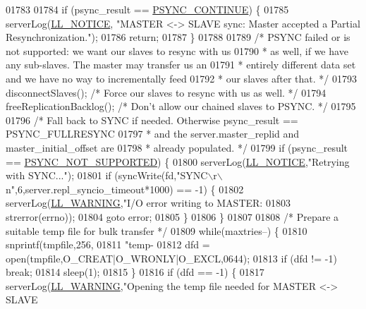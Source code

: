 \begin{DoxyCode}
{{{{{{{{{{{{{{{{{{{{{{{{{{{{{{{{{{{{{{{{{{{{{{{{{{{{{{{{{{{{{{{{{01783 
01784     \textcolor{keywordflow}{if} (psync\_result == \hyperlink{replication_8c_a96f39718bf5cfd2859bdaea530f509b9}{PSYNC\_CONTINUE}) \{
01785         serverLog(\hyperlink{server_8h_a8c54c191e436c7dd3012167212692401}{LL\_NOTICE}, \textcolor{stringliteral}{"MASTER <-> SLAVE sync: Master accepted a Partial
       Resynchronization."});
01786         \textcolor{keywordflow}{return};
01787     \}
01788 
01789     \textcolor{comment}{/* PSYNC failed or is not supported: we want our slaves to resync with us}
01790 \textcolor{comment}{     * as well, if we have any sub-slaves. The master may transfer us an}
01791 \textcolor{comment}{     * entirely different data set and we have no way to incrementally feed}
01792 \textcolor{comment}{     * our slaves after that. */}
01793     disconnectSlaves(); \textcolor{comment}{/* Force our slaves to resync with us as well. */}
01794     freeReplicationBacklog(); \textcolor{comment}{/* Don't allow our chained slaves to PSYNC. */}
01795 
01796     \textcolor{comment}{/* Fall back to SYNC if needed. Otherwise psync\_result == PSYNC\_FULLRESYNC}
01797 \textcolor{comment}{     * and the server.master\_replid and master\_initial\_offset are}
01798 \textcolor{comment}{     * already populated. */}
01799     \textcolor{keywordflow}{if} (psync\_result == \hyperlink{replication_8c_a9722855166099ab95f712e73ed819abf}{PSYNC\_NOT\_SUPPORTED}) \{
01800         serverLog(\hyperlink{server_8h_a8c54c191e436c7dd3012167212692401}{LL\_NOTICE},\textcolor{stringliteral}{"Retrying with SYNC..."});
01801         \textcolor{keywordflow}{if} (syncWrite(fd,\textcolor{stringliteral}{"SYNC\(\backslash\)r\(\backslash\)n"},6,server.repl\_syncio\_timeout*1000) == -1) \{
01802             serverLog(\hyperlink{server_8h_a31229b9334bba7d6be2a72970967a14b}{LL\_WARNING},\textcolor{stringliteral}{"I/O error writing to MASTER: %
01803                 strerror(errno));
01804             \textcolor{keywordflow}{goto} error;
01805         \}
01806     \}
01807 
01808     \textcolor{comment}{/* Prepare a suitable temp file for bulk transfer */}
01809     \textcolor{keywordflow}{while}(maxtries--) \{
01810         snprintf(tmpfile,256,
01811             \textcolor{stringliteral}{"temp-%
01812         dfd = open(tmpfile,O\_CREAT|O\_WRONLY|O\_EXCL,0644);
01813         \textcolor{keywordflow}{if} (dfd != -1) \textcolor{keywordflow}{break};
01814         sleep(1);
01815     \}
01816     \textcolor{keywordflow}{if} (dfd == -1) \{
01817         serverLog(\hyperlink{server_8h_a31229b9334bba7d6be2a72970967a14b}{LL\_WARNING},\textcolor{stringliteral}{"Opening the temp file needed for MASTER <-> SLAVE
}}}}}}}}}}}}}}}}}}}}}}}}}}}}}}}}}}}}}}}}}}}}}}}}}}}}}}}}}}}}}}}}}}}}
\end{DoxyCode}
